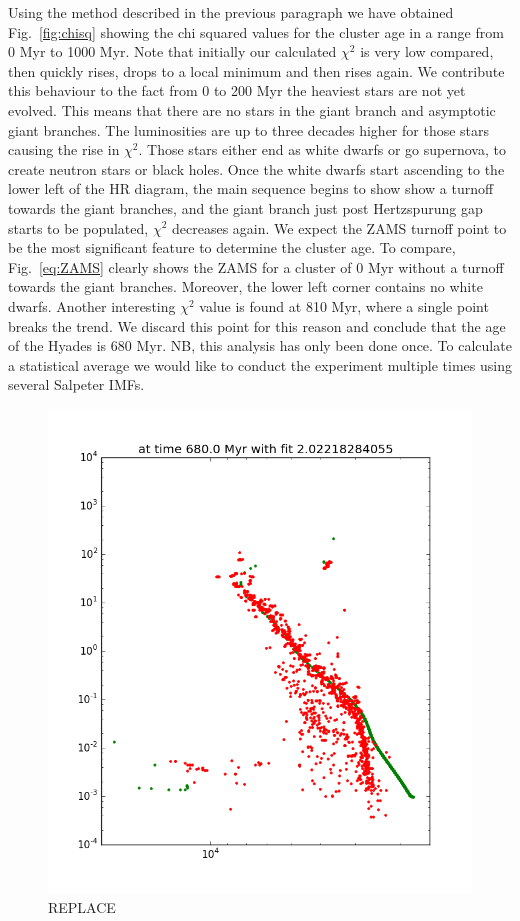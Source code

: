 \documentclass{aa}
\begin{document}
Using the method described in the previous paragraph we have obtained Fig.~\ref{fig:chisq} showing the chi squared values for the cluster age in a range from 0 Myr to 1000 Myr. Note that initially our calculated $\chi^2$ is very low compared, then quickly rises, drops to a local minimum and then rises again. We contribute this behaviour to the fact from 0 to 200 Myr the heaviest stars are not yet evolved. This means that there are no stars in the giant branch and asymptotic giant branches. The luminosities are up to three decades higher for those stars causing the rise in $\chi^2$. Those stars either end as white dwarfs or go supernova, to create neutron stars or black holes. Once the white dwarfs start ascending to the lower left of the HR diagram, the main sequence begins to show show a turnoff towards the giant branches, and the giant branch just post Hertzspurung gap starts to be populated, $\chi^2$ decreases again. We expect the ZAMS turnoff point to be the most significant feature to determine the cluster age. To compare, Fig.~\ref{eq:ZAMS} clearly shows the ZAMS for a cluster of 0 Myr without a turnoff towards the giant branches. Moreover, the lower left corner contains no white dwarfs. Another interesting $\chi^2$ value is found at 810 Myr, where a single point breaks the trend. We discard this point for this reason and conclude that the age of the Hyades is 680 Myr. NB, this analysis has only been done once. To calculate a statistical average we would like to conduct the experiment multiple times using several Salpeter IMFs.

\begin{figure}
    \centering
    \includegraphics[width=\hsize]{img/test680.png}
    \caption{REPLACE}\label{fig:bestfit}
\end{figure}
\end{document}
